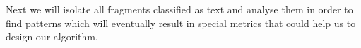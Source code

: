  
 
  Next we will isolate all fragments classified as text and analyse them in order to find patterns which will eventually result in special metrics that could help us to design our algorithm.
 


